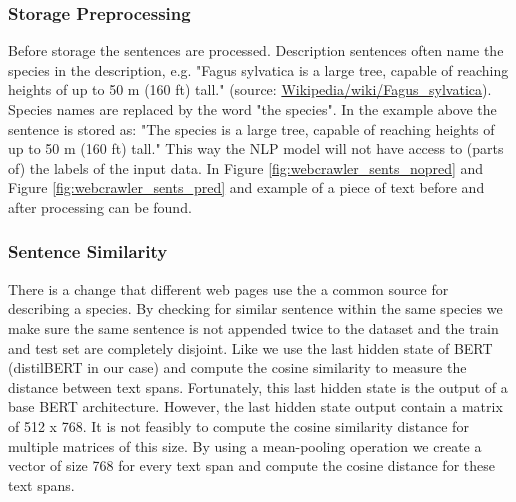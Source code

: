 \documentclass[a4paper, 12pt, oneside]{book} %
\begin{document}
\subsubsection{Storage Preprocessing} \label{Preprocessing}
Before storage the sentences are processed.
Description sentences often name the species in the description, e.g. "Fagus sylvatica is a large tree, capable of reaching heights of up to 50 m (160 ft) tall." (source: \href{https://en.wikipedia.org/wiki/Fagus_sylvatica}{Wikipedia/wiki/Fagus\_sylvatica}).
Species names are replaced by the word "the species". 
In the example above the sentence is stored as: "The species is a large tree, capable of reaching heights of up to 50 m (160 ft) tall."
This way the NLP model will not have access to (parts of) the labels of the input data. In Figure \ref{fig:webcrawler_sents_nopred} and Figure \ref{fig:webcrawler_sents_pred} and example of a piece of text before and after processing can be found.

\subsubsection{Sentence Similarity} \label{Sentence Similarity}
There is a change that different web pages use the a common source for describing a species.
By checking for similar sentence within the same species we make sure the same sentence is not appended twice to the dataset and the train and test set are completely disjoint.
Like \textcite{reimers_sentence-bert_2019} we use the last hidden state of BERT (distilBERT in our case) and compute the cosine similarity to measure the distance between text spans.
Fortunately, this last hidden state is the output of a base BERT architecture.
However, the last hidden state output contain a matrix of 512 x 768. 
It is not feasibly to compute the cosine similarity distance for multiple matrices of this size.
By using a mean-pooling operation we create a vector of size 768 for every text span and compute the cosine distance for these text spans.
\end{document}
